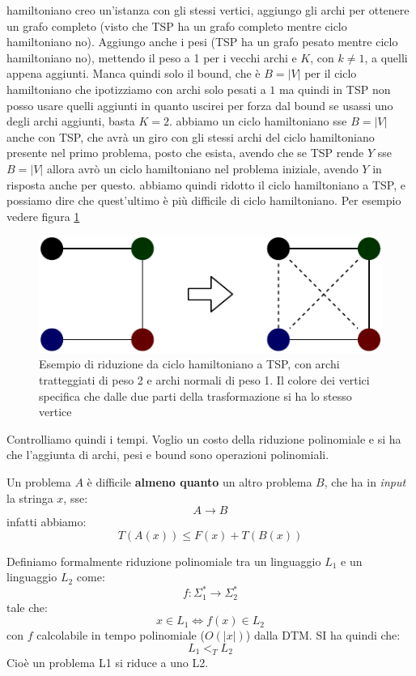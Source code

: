 hamiltoniano creo un'istanza con gli stessi vertici, aggiungo gli archi per
ottenere un grafo completo (visto che TSP ha un grafo completo mentre ciclo
hamiltoniano no). Aggiungo anche i pesi (TSP ha un grafo pesato mentre ciclo
hamiltoniano no), mettendo il peso a 1 per i vecchi archi
e $K$, con $k\neq 1$, a quelli appena aggiunti. Manca quindi
solo il bound, che è $B=|V|$ per il ciclo hamiltoniano che ipotizziamo con archi
solo pesati a $1$ ma quindi in TSP non posso usare quelli aggiunti in quanto
uscirei per forza dal bound se usassi uno degli archi aggiunti, basta $K=2$. abbiamo
un ciclo hamiltoniano sse $B=|V|$ anche con TSP, che avrà un giro con gli stessi
archi del ciclo hamiltoniano presente nel primo problema, posto che esista,
avendo che se TSP rende $Y$ sse $B=|V|$ allora avrò un ciclo hamiltoniano nel
problema iniziale, avendo $Y$ in risposta anche per questo. abbiamo quindi ridotto il
ciclo hamiltoniano a TSP, e possiamo dire che quest'ultimo è più difficile di
ciclo hamiltoniano. Per esempio vedere figura \ref{fig:htsp}
\begin{figure}
  \centering
  \includegraphics[scale = 0.9]{img/rid.pdf}
  \caption{Esempio di riduzione da ciclo hamiltoniano a TSP, con archi
    tratteggiati di peso 2 e archi normali di peso 1. Il colore dei vertici
    specifica che dalle due parti della trasformazione si ha lo stesso vertice}
  \label{fig:htsp}
\end{figure}
Controlliamo quindi i tempi. Voglio un costo della riduzione polinomiale e si ha
che l'aggiunta di archi, pesi e bound sono operazioni polinomiali.
\begin{definizione}
 Un problema $A$ è difficile \textbf{almeno quanto} un altro problema $B$, che ha in \textit{input} la stringa
  $x$, sse:
  \[A\to B\]
  infatti abbiamo:
  \[T(A(x))\leq F(x)+T(B(x))\]
\end{definizione}
\begin{definizione}
  Definiamo formalmente riduzione polinomiale tra un linguaggio $L_1$ e un
  linguaggio $L_2$ come:
  \[f:\Sigma_1^*\to \Sigma_2^*\]
  tale che:
  \[x\in L_1\iff f(x)\in L_2\]
  con $f$ calcolabile in tempo polinomiale ($O(|x|)$) dalla DTM. SI ha quindi
  che:
  \[L_1<_T L_2\]
  Cioè un problema L1 si riduce a uno L2.
\end{definizione}
